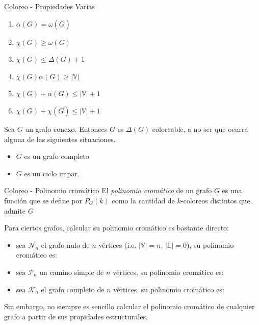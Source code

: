 \documentclass[10pt]{beamer}
\newcommand \anchoPagina{1.0} %
\begin{document}
\begin{frame}{Coloreo - Propiedades Varias}
	\begin{minipage}{\anchoPagina \textwidth}
	    \footnotesize
	    \begin{tcolorbox}[title=Propiedades]
		\begin{enumerate}
			\item $\alpha(G) = \omega(\overline{G})$ 
			\item $\chi(G) \geq \omega(G)$
			\item $\chi(G) \leq \Delta(G) + 1$
			\item $\chi(G)\alpha(G) \geq |\mathbb{V}| $
			\item $\chi(G) + \alpha(G) \leq |\mathbb{V}|+1$ 
			\item $\chi(G) + \chi(\overline{G}) \leq |\mathbb{V}|+1$
		\end{enumerate}
		\end{tcolorbox}
		\vspace{0.4cm}
		\begin{tcolorbox}[title=Teorema de Brooks]
		Sea $G$ un grafo conexo. Entonces $G$ es $\Delta(G)$ coloreable, a no ser que ocurra alguna de las siguientes situaciones.
		\begin{itemize}
			\item $G$ es un grafo completo
			\item $G$ es un ciclo impar.
		\end{itemize}
		\end{tcolorbox}
	\end{minipage}
\end{frame}

\begin{frame}{Coloreo - Polinomio cromático}
        \small
		El \textit{polinomio crom\'atico} de un grafo $G$ es una funci\'on que se define por $P_{G}(k)$ como la cantidad de $k$-coloreos distintos que admite $G$
		
		Para ciertos grafos, calcular su polinomio cromático es bastante directo:
		\begin{itemize}
		    \item sea $\mathcal{N}_n$ el grafo nulo de $n$ vértices (i.e. $|\mathbb{V}|=n$, $|\mathbb{E}| = 0$), su polinomio cromático es: 
		    \visible<2>{\[ P_{\mathcal{N}_n}(k) = k^n\]}
		    \item sea $\mathcal{P}_n$ un camino simple de $n$ vértices, su polinomio cromático es:
		    \visible<2>{\[P_{\mathcal{P}_n}(k) = k(k-1)^{n-1}\]}
		    \item sea $\mathcal{K}_n$ el grafo completo de $n$ vértices, su polinomio cromático es:
		    \visible<2>{\[P_{\mathcal{K}_n}(k) = k(k-1)(k-2)(k-3)\dots(k-n+1)\]}
		\end{itemize}
		Sin embargo, no siempre es sencillo calcular el polinomio cromático de cualquier grafo a partir de sus propidades estructurales.
\end{frame}
\end{document}
